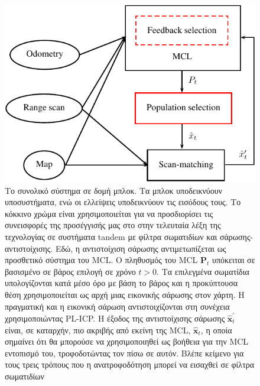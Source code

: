 \begin{figure}[ht]\centering
  \includegraphics[scale=0.9]{./figures/parts/02/chapters/02/sections/03/overall_system}
  \caption{\small Το συνολικό σύστημα σε δομή μπλοκ. Τα μπλοκ υποδεικνύουν
           υποσυστήματα, ενώ οι ελλείψεις υποδεικνύουν τις εισόδους τους. Το κόκκινο χρώμα είναι
           χρησιμοποιείται για να προσδιορίσει τις συνεισφορές της προσέγγισής μας στο
           στην τελευταία λέξη της τεχνολογίας σε συστήματα tandem με φίλτρα σωματιδίων και
           σάρωσης-αντιστοίχισης.  Εδώ, η αντιστοίχιση σάρωσης αντιμετωπίζεται ως προσθετικό σύστημα του
           MCL. Ο πληθυσμός του MCL $\bm{P}_t$ υπόκειται σε βασισμένο σε βάρος
           επιλογή σε χρόνο $t>0$. Τα επιλεγμένα σωματίδια υπολογίζονται κατά μέσο όρο με βάση το βάρος
           και η προκύπτουσα θέση χρησιμοποιείται ως αρχή μιας εικονικής σάρωσης
           στον χάρτη. Η πραγματική και η εικονική σάρωση αντιστοιχίζονται στη συνέχεια χρησιμοποιώντας
           PL-ICP. Η έξοδος της αντιστοίχισης σάρωσης $\hat{\bm{x}}^{\prime}_t$ είναι, σε
           καταρχήν, πιο ακριβής από εκείνη της MCL, $\hat{\bm{x}}_t$, η οποία
           σημαίνει ότι θα μπορούσε να χρησιμοποιηθεί ως βοήθεια για την MCL
           εντοπισμό του, τροφοδοτώντας τον πίσω σε αυτόν.  Βλέπε κείμενο για τους τρεις τρόπους
           που η ανατροφοδότηση μπορεί να εισαχθεί σε φίλτρα σωματιδίων}
  \label{fig:overall_system}
\end{figure}


